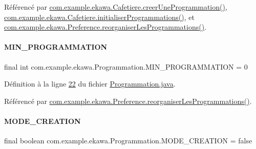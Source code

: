 Référencé par \hyperlink{_cafetiere_8java_source_l00731}{com.\+example.\+ekawa.\+Cafetiere.\+creer\+Une\+Programmation()}, \hyperlink{_cafetiere_8java_source_l00692}{com.\+example.\+ekawa.\+Cafetiere.\+initialiser\+Programmations()}, et \hyperlink{_preference_8java_source_l00157}{com.\+example.\+ekawa.\+Preference.\+reorganiser\+Les\+Programmations()}.

\mbox{\label{classcom_1_1example_1_1ekawa_1_1_programmation_a1167f22eb96c9c94bfc407aa3e166237}} 
\paragraph{\texorpdfstring{M\+I\+N\+\_\+\+P\+R\+O\+G\+R\+A\+M\+M\+A\+T\+I\+ON}{MIN\_PROGRAMMATION}}
{\footnotesize\ttfamily final int com.\+example.\+ekawa.\+Programmation.\+M\+I\+N\+\_\+\+P\+R\+O\+G\+R\+A\+M\+M\+A\+T\+I\+ON = 0\hspace{0.3cm}{\ttfamily [static]}}



Définition à la ligne \hyperlink{_programmation_8java_source_l00022}{22} du fichier \hyperlink{_programmation_8java_source}{Programmation.\+java}.



Référencé par \hyperlink{_preference_8java_source_l00157}{com.\+example.\+ekawa.\+Preference.\+reorganiser\+Les\+Programmations()}.

\mbox{\label{classcom_1_1example_1_1ekawa_1_1_programmation_a79242eac5d971bdb23eaf4ab930f774d}} 
\paragraph{\texorpdfstring{M\+O\+D\+E\+\_\+\+C\+R\+E\+A\+T\+I\+ON}{MODE\_CREATION}}
{\footnotesize\ttfamily final boolean com.\+example.\+ekawa.\+Programmation.\+M\+O\+D\+E\+\_\+\+C\+R\+E\+A\+T\+I\+ON = false\hspace{0.3cm}{\ttfamily [static]}}



